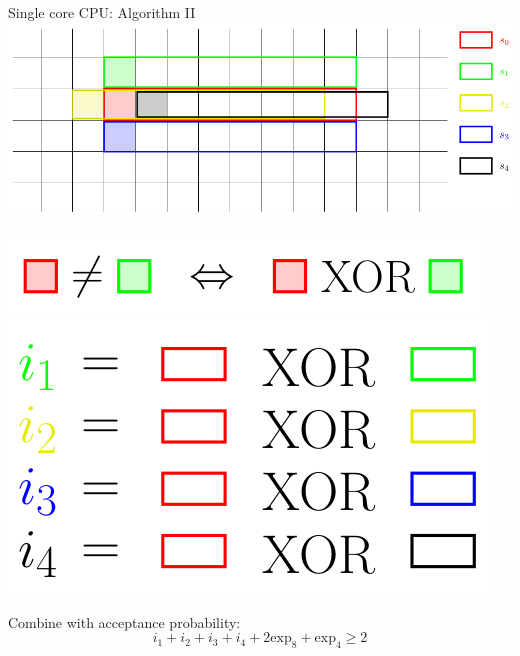 \documentclass{beamer}
\begin{document}
\begin{frame}{Single core CPU: Algorithm II}
\includegraphics[keepaspectratio=true, width=\textwidth]{images/single_core2.png}\\ \pause
\begin{minipage}{0.5\textwidth}
    \includegraphics[keepaspectratio=true, width=\textwidth]{images/single_core3.png}\\ \pause
    \includegraphics[keepaspectratio=true, width=\textwidth]{images/single_core4.png} \pause
\end{minipage}
\hfill\vline\hfill
\begin{minipage}{0.4\textwidth}
    Combine with acceptance probability:
    \begin{equation*}
        i_1 + i_2 + i_3 + i_4 + 2 \text{exp}_8 + \text{exp}_4 \geq 2
    \end{equation*}
\end{minipage}
\end{frame}
\end{document}
